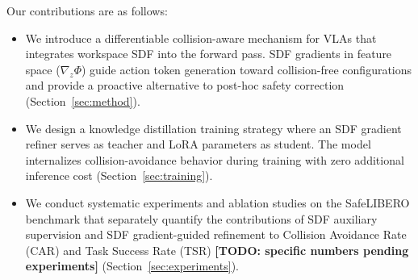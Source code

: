 Our contributions are as follows:
\begin{itemize}
    \item We introduce a differentiable collision-aware mechanism for VLAs that integrates workspace SDF into the forward pass. SDF gradients in feature space ($\nabla_z \Phi$) guide action token generation toward collision-free configurations and provide a proactive alternative to post-hoc safety correction (Section~\ref{sec:method}).
    \item We design a knowledge distillation training strategy where an SDF gradient refiner serves as teacher and LoRA parameters as student. The model internalizes collision-avoidance behavior during training with zero additional inference cost (Section~\ref{sec:training}).
    \item We conduct systematic experiments and ablation studies on the SafeLIBERO benchmark that separately quantify the contributions of SDF auxiliary supervision and SDF gradient-guided refinement to Collision Avoidance Rate (CAR) and Task Success Rate (TSR) \textbf{[TODO: specific numbers pending experiments]} (Section~\ref{sec:experiments}).
\end{itemize}
